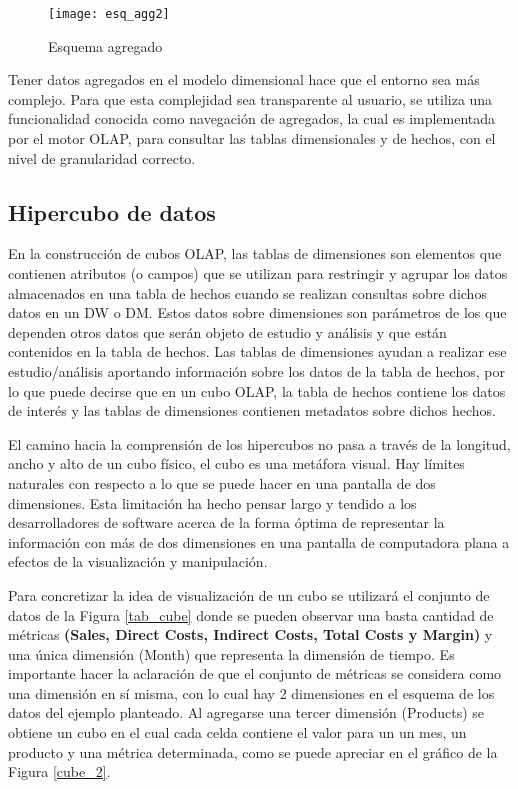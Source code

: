\documentclass[a4paper,11pt]{article}
\begin{document}
    \begin{figure}
      \begin{center}
        \texttt{[image: esq\_agg2]}
        \caption{Esquema agregado} \cite{agg_tables}
        \label{sch_agg2}
      \end{center}
    \end{figure}
    
    Tener datos agregados en el modelo dimensional hace que el entorno sea más complejo. Para que esta complejidad sea transparente al usuario, se utiliza
    una funcionalidad conocida como navegación de agregados, la cual es implementada por el motor OLAP, para consultar las tablas dimensionales y de hechos,
    con el nivel de granularidad correcto.
    
    
    \subsection{Hipercubo de datos}
    
    En la construcción de cubos OLAP, las tablas de dimensiones son elementos que contienen atributos (o campos) que se utilizan para restringir y agrupar
    los datos almacenados en una tabla de hechos cuando se realizan consultas sobre dichos datos en un DW o DM. Estos datos sobre dimensiones son parámetros
    de los que dependen otros datos que serán objeto de estudio y análisis y que están contenidos en la tabla de hechos. Las tablas de dimensiones ayudan a
    realizar ese estudio/análisis aportando información sobre los datos de la tabla de hechos, por lo que puede decirse que en un cubo OLAP, la tabla de
    hechos contiene los datos de interés y las tablas de dimensiones contienen metadatos sobre dichos hechos.\par

    El camino hacia la comprensión de los hipercubos no pasa a través de la longitud, ancho y alto de un cubo físico, el cubo es una metáfora visual. Hay
    límites naturales con respecto a lo que se puede hacer en una pantalla de dos dimensiones. Esta limitación ha hecho pensar largo y tendido a los
    desarrolladores de software acerca de la forma óptima de representar la información con más de dos dimensiones en una pantalla de computadora plana a
    efectos de la visualización y manipulación.\par
    
    Para concretizar la idea de visualización de un cubo se utilizará el conjunto de datos de la Figura \ref{tab_cube} donde se pueden observar una basta cantidad de
    métricas \textbf{(Sales, Direct Costs, Indirect Costs, Total Costs y Margin)} y una única dimensión (Month) que representa la dimensión de tiempo. Es
    importante hacer la aclaración de que el conjunto de métricas se considera como una dimensión en sí misma, con lo cual hay 2 dimensiones en el esquema de
    los datos del ejemplo planteado. Al agregarse una tercer dimensión (Products) se obtiene un cubo en el cual cada celda contiene el valor para un un mes,
    un producto y una métrica determinada, como se puede apreciar en el gráfico de la Figura \ref{cube_2}.
    
\end{document}
